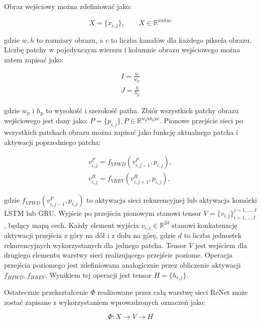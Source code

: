 \documentclass[oneside, mag]{mgr}
\begin{document}
Obraz wejściowy można zdefiniować jako:

\begin{equation}
	X = \{x_{i,j}\},\qquad X \in \mathbb{R}^{w \textrm{x} h \textrm{x} c}
\end{equation}

gdzie $w, h$ to rozmiary obrazu, a $c$ to liczba kanałów dla każdego piksela obrazu. Liczbę patchy w pojedynczym wierszu i kolumnie obrazu wejściowego można zatem zapisać jako:

\begin{gather}
	I=\frac{w}{w_p} \\
	J=\frac{h}{h_p} \nonumber
\end{gather}

gdzie $w_p$ i $h_p$ to wysokość i szerokość patha. Zbiór wszystkich patchy obrazu wejściowego jest dany jako: $P = \{p_{i,j}\}, P \in \mathbb{R}^{w_p \textrm{x} h_p \textrm{x} c}$. Pionowe przejście sieci po wszystkich patchach obrazu można zapisać jako funkcję aktualnego patcha i aktywacji poprzedniego patcha:

\begin{gather}
    v_{i,j}^{F} = f_{VFWD} (v_{i,j-1}^F, p_{i,j}), \\
    v_{i,j}^{R} = f_{VREV} (v_{i,j+1}^R, p_{i,j}), \nonumber
\end{gather}

gdzie $f_{VFWD} (v_{i,j-1}^F, p_{i,j})$ to aktywacja sieci rekurencyjnej lub aktywacja komórki LSTM lub GRU. Wyjście po przejściu pionowym stanowi tensor $V = \{v_{i,j}\}_{i=1,...,I}^{j=1,...,J}$, będący mapą cech. Każdy element wyjścia $v_{i,j} \in \mathbb{R}^{2d}$ stanowi konkatenację aktywacji przejścia z góry na dół i z dołu na górę, gdzie $d$ to liczba jednostek rekurencyjnych wykorzystanych dla jednego patcha. Tensor $V$ jest wejściem dla drugiego elementu warstwy sieci realizującego przejście poziome. Operacja przejścia poziomego jest zdefiniowana analogicznie przez obliczenie aktywacji $f_{HFWD}, f_{HREV}$. Wynikiem tej operacji jest tensor $H = \{h_{i,j}\}$. 

Ostatecznie przekształcenie $\Phi$ realizowane przez całą warstwę sieci ReNet może zostać zapisane z wykorzystaniem wprowadzonych oznaczeń jako:

\begin{equation}
	\Phi: X \rightarrow V \rightarrow H
\end{equation}
\end{document}
